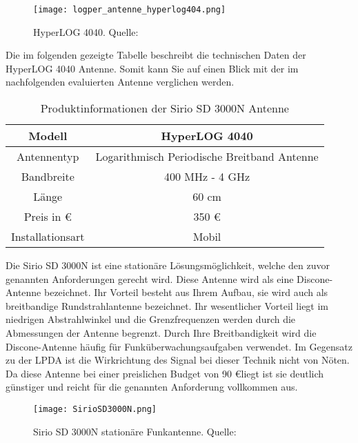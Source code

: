 \begin{figure}[H]
	\centering
	\texttt{[image: logper\_antenne\_hyperlog404.png]}
	\caption[HyperLOG 4040]{HyperLOG 4040. Quelle: \cite{Funktechnik:2018}} 
	\label{HyperLOG 4040}
\end{figure}  

Die im folgenden gezeigte Tabelle beschreibt die technischen Daten der HyperLOG 4040 Antenne. Somit kann Sie auf einen Blick mit der im nachfolgenden evaluierten Antenne verglichen werden.

\begin{table}[H]
	\centering
	\begin{tabular}{c|c}
		Modell & HyperLOG 4040\\
		\hline
		Antennentyp & Logarithmisch Periodische Breitband Antenne\\ 
		\hline 
		Bandbreite & 400 MHz - 4 GHz\\ 
		\hline 
		Länge &  60 cm\\ 
		\hline 
		Preis in \euro &  350 \euro \\ 
		\hline 
		Installationsart & Mobil\\ 
		
	\end{tabular} 
	\caption{Produktinformationen der Sirio SD 3000N Antenne}
\end{table}

Die Sirio SD 3000N ist eine stationäre Lösungsmöglichkeit, welche den zuvor genannten Anforderungen gerecht wird. Diese Antenne wird als eine Discone-Antenne bezeichnet. Ihr Vorteil besteht aus Ihrem Aufbau, sie wird auch als breitbandige Rundstrahlantenne bezeichnet. Ihr wesentlicher Vorteil liegt im niedrigen Abstrahlwinkel und die Grenzfrequenzen werden durch die Abmessungen der Antenne begrenzt. Durch Ihre Breitbandigkeit wird die Discone-Antenne häufig für Funküberwachungsaufgaben verwendet. Im Gegensatz zu der LPDA ist die Wirkrichtung des Signal bei dieser Technik nicht von Nöten. Da diese Antenne bei einer preislichen Budget von 90 \euro liegt ist sie deutlich günstiger und reicht für die genannten Anforderung vollkommen aus.


\begin{figure}[ht]
	\centering
	\texttt{[image: SirioSD3000N.png]}
	\caption[Sirio SD 3000N stationäre Funkantenne]{Sirio SD 3000N stationäre Funkantenne. Quelle: \cite{Funktechnik:2018}} 
	\label{Sirio SD 3000N Antenne}
\end{figure}

